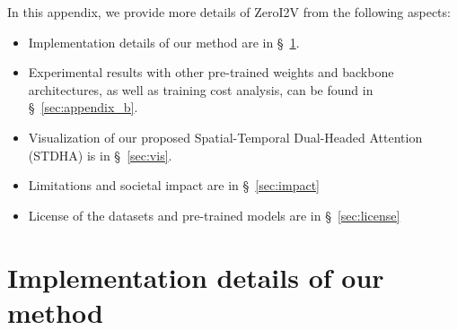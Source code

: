 \newpage
In this appendix, we provide more details of ZeroI2V from the following aspects:
\begin{itemize}

    \item Implementation details of our method are in \S~\ref{sec:appendix_a}.
    \item Experimental results with other pre-trained weights and backbone architectures, as well as training cost analysis, can be found in \S~\ref{sec:appendix_b}.
    \item Visualization of our proposed Spatial-Temporal Dual-Headed Attention (STDHA) is in \S~\ref{sec:vis}.
    \item Limitations and societal impact are in \S~\ref{sec:impact}
    \item License of the datasets and pre-trained models are in \S~\ref{sec:license}
\end{itemize}

\section{Implementation details of our method}
\label{sec:appendix_a}

